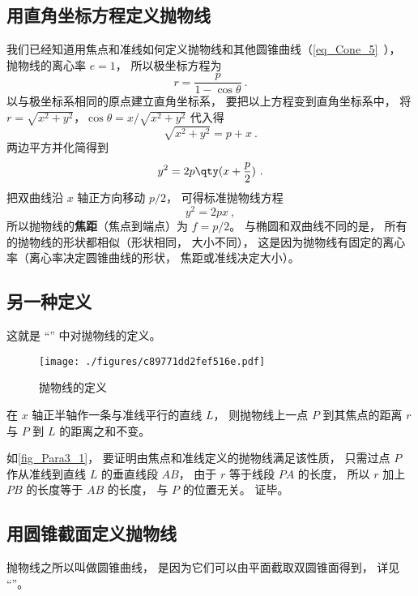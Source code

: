 

\subsection{用直角坐标方程定义抛物线}
我们已经知道用焦点和准线如何定义抛物线和其他圆锥曲线（\autoref{eq_Cone_5}~）， 抛物线的离心率 $e = 1$， 所以极坐标方程为
\begin{equation}\label{eq_Para3_1}
r = \frac{p}{1 - \cos \theta }~.
\end{equation}
以与极坐标系相同的原点建立直角坐标系， 要把以上方程变到直角坐标系中， 将$r = \sqrt{x^2 + y^2}$，$\cos \theta  = x/\sqrt{x^2 + y^2}$ 代入得
\begin{equation}
\sqrt{x^2 + y^2}  = p + x~.
\end{equation}
两边平方并化简得到
\begin{equation}
y^2 = 2p \qty(x + \frac p2)~.
\end{equation}
把双曲线沿 $x$ 轴正方向移动 $p/2$， 可得标准抛物线方程
\begin{equation}\label{eq_Para3_2}
y^2 = 2px~,
\end{equation}
所以抛物线的\textbf{焦距}（焦点到端点）为 $f = p/2$。 与椭圆和双曲线不同的是， 所有的抛物线的形状都相似（形状相同， 大小不同）， 这是因为抛物线有固定的离心率（离心率决定圆锥曲线的形状， 焦距或准线决定大小）。

\subsection{另一种定义}
这就是 “” 中对抛物线的定义。
\begin{figure}[ht]
\centering
\texttt{[image: ./figures/c89771dd2fef516e.pdf]}
\caption{抛物线的定义} \label{fig_Para3_1}
\end{figure}

在 $x$ 轴正半轴作一条与准线平行的直线 $L$， 则抛物线上一点 $P$ 到其焦点的距离 $r$ 与 $P$ 到 $L$ 的距离之和不变。

如\autoref{fig_Para3_1}， 要证明由焦点和准线定义的抛物线满足该性质， 只需过点 $P$ 作从准线到直线 $L$ 的垂直线段 $AB$， 由于 $r$ 等于线段 $PA$ 的长度， 所以 $r$ 加上 $PB$ 的长度等于 $AB$ 的长度， 与 $P$ 的位置无关。 证毕。

\subsection{用圆锥截面定义抛物线}
抛物线之所以叫做圆锥曲线， 是因为它们可以由平面截取双圆锥面得到， 详见 “”。

